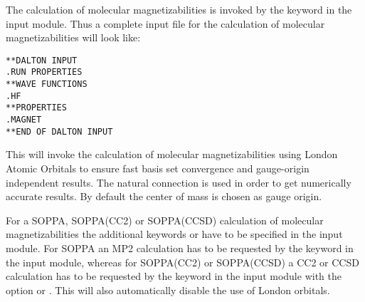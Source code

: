 \begin{center}
\end{center}

The calculation of molecular magnetizabilities
is invoked by the
keyword  in the  input module. Thus
a complete input file for the calculation of molecular
magnetizabilities will look like:

\begin{verbatim}
**DALTON INPUT
.RUN PROPERTIES
**WAVE FUNCTIONS
.HF
**PROPERTIES
.MAGNET
**END OF DALTON INPUT
\end{verbatim}

This will invoke the calculation of molecular magnetizabilities using
London Atomic Orbitals to ensure fast basis set
convergence and
gauge-origin independent results.
The natural connection
\cite{joklbkrthpjtca90} is used in order to get numerically accurate
results. By default the center of mass is chosen
as gauge origin.

For a SOPPA, SOPPA(CC2) or
SOPPA(CCSD) calculation of molecular
magnetizabilities the additional keywords  or
 have to be specified in the  input
module. For SOPPA an MP2 calculation has to be requested by the keyword
 in the  input module, whereas for
SOPPA(CC2) or SOPPA(CCSD) a CC2 or CCSD calculation has to be requested
by the keyword  in the  input module with the  option
 or . This will also automatically disable
the use of London orbitals.

